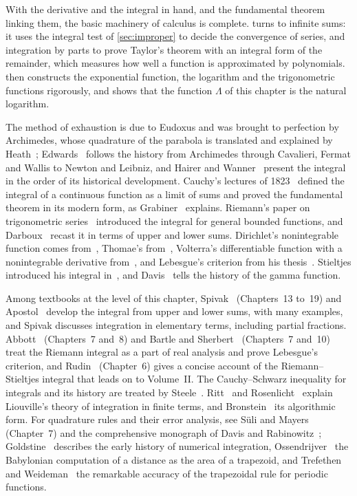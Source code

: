 \bigskip
With the derivative and the integral in hand, and the fundamental theorem linking them, the basic machinery of calculus is complete.  turns to infinite sums: it uses the integral test of \cref{sec:improper} to decide the convergence of series, and integration by parts to prove Taylor's theorem with an integral form of the remainder, which measures how well a function is approximated by polynomials.  then constructs the exponential function, the logarithm and the trigonometric functions rigorously, and shows that the function $\Lambda$ of this chapter is the natural logarithm.

\chapternotes

The method of exhaustion is due to Eudoxus and was brought to perfection by Archimedes, whose quadrature of the parabola is translated and explained by Heath~\cite{heath1897archimedes}; Edwards~\cite{edwards1979} follows the history from Archimedes through Cavalieri, Fermat and Wallis to Newton and Leibniz, and Hairer and Wanner~\cite{hairer1996analysis} present the integral in the order of its historical development. Cauchy's lectures of 1823~\cite{cauchy1823} defined the integral of a continuous function as a limit of sums and proved the fundamental theorem in its modern form, as Grabiner~\cite{grabiner1981} explains. Riemann's paper on trigonometric series~\cite{riemann1867} introduced the integral for general bounded functions, and Darboux~\cite{darboux1875} recast it in terms of upper and lower sums. Dirichlet's nonintegrable function comes from~\cite{dirichlet1829}, Thomae's from~\cite{thomae1875}, Volterra's differentiable function with a nonintegrable derivative from~\cite{volterra1881}, and Lebesgue's criterion from his thesis~\cite{lebesgue1902}. Stieltjes introduced his integral in~\cite{stieltjes1894}, and Davis~\cite{davis1959gamma} tells the history of the gamma function.

Among textbooks at the level of this chapter, Spivak~\cite{spivak2008calculus} (Chapters~13 to~19) and Apostol~\cite{apostol1967calculus} develop the integral from upper and lower sums, with many examples, and Spivak discusses integration in elementary terms, including partial fractions. Abbott~\cite{abbott2015} (Chapters~7 and~8) and Bartle and Sherbert~\cite{bartle2011} (Chapters~7 and~10) treat the Riemann integral as a part of real analysis and prove Lebesgue's criterion, and Rudin~\cite{rudin1976} (Chapter~6) gives a concise account of the Riemann--Stieltjes integral that leads on to Volume~II. The Cauchy--Schwarz inequality for integrals and its history are treated by Steele~\cite{steele2004}. Ritt~\cite{ritt1948} and Rosenlicht~\cite{rosenlicht1972} explain Liouville's theory of integration in finite terms, and Bronstein~\cite{bronstein2005} its algorithmic form. For quadrature rules and their error analysis, see S\"uli and Mayers~\cite{suli2003} (Chapter~7) and the comprehensive monograph of Davis and Rabinowitz~\cite{davis1984}; Goldstine~\cite{goldstine1977} describes the early history of numerical integration, Ossendrijver~\cite{ossendrijver2016} the Babylonian computation of a distance as the area of a trapezoid, and Trefethen and Weideman~\cite{trefethen2014} the remarkable accuracy of the trapezoidal rule for periodic functions.

\chapterreferences
